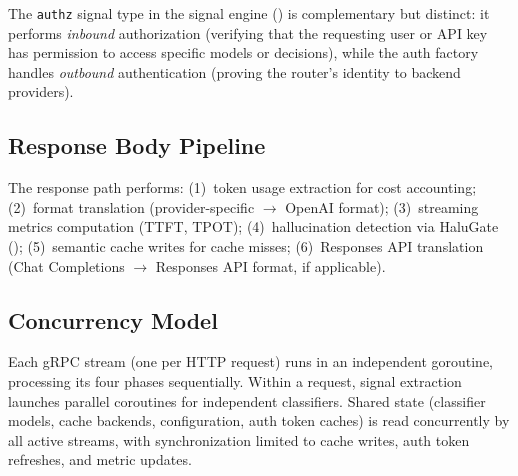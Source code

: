 The \texttt{authz} signal type in the signal engine () is complementary but distinct: it performs \emph{inbound} authorization (verifying that the requesting user or API key has permission to access specific models or decisions), while the auth factory handles \emph{outbound} authentication (proving the router's identity to backend providers).

\subsection{Response Body Pipeline}

The response path performs:
(1)~token usage extraction for cost accounting;
(2)~format translation (provider-specific $\to$ OpenAI format);
(3)~streaming metrics computation (TTFT, TPOT);
(4)~hallucination detection via HaluGate ();
(5)~semantic cache writes for cache misses;
(6)~Responses API translation (Chat Completions $\to$ Responses API format, if applicable).

\subsection{Concurrency Model}

Each gRPC stream (one per HTTP request) runs in an independent goroutine, processing its four phases sequentially.
Within a request, signal extraction launches parallel coroutines for independent classifiers.
Shared state (classifier models, cache backends, configuration, auth token caches) is read concurrently by all active streams, with synchronization limited to cache writes, auth token refreshes, and metric updates.
